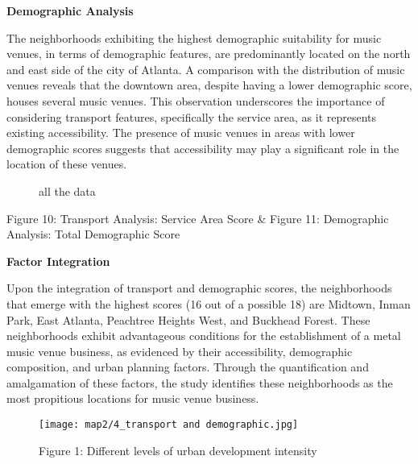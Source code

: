 \documentclass[11pt]{article}
\begin{document}
\textbf{Demographic Analysis}

The neighborhoods exhibiting the highest demographic suitability for music venues, in terms of demographic features, are predominantly located on the north and east side of the city of Atlanta. A comparison with the distribution of music venues reveals that the downtown area, despite having a lower demographic score, houses several music venues. This observation underscores the importance of considering transport features, specifically the service area, as it represents existing accessibility. The presence of music venues in areas with lower demographic scores suggests that accessibility may play a significant role in the location of these venues.

\begin{figure}[H] 
    \centering
    \hfill%
    \caption{all the data}
\end{figure}

\begin{center}
\centering
Figure 10: Transport Analysis: Service Area Score \& Figure 11: Demographic Analysis: Total Demographic Score
\end{center}

\newpage

\textbf{Factor Integration}

Upon the integration of transport and demographic scores, the neighborhoods that emerge with the highest scores (16 out of a possible 18) are Midtown, Inman Park, East Atlanta, Peachtree Heights West, and Buckhead Forest. These neighborhoods exhibit advantageous conditions for the establishment of a metal music venue business, as evidenced by their accessibility, demographic composition, and urban planning factors. Through the quantification and amalgamation of these factors, the study identifies these neighborhoods as the most propitious locations for music venue business.

\begin{figure}[H]
\begin{center}
\centering
\texttt{[image: map2/4\_transport and demographic.jpg]}
\caption{Figure 1: Different levels of urban development intensity}
\label{fig:figure1}
\end{center}
\end{figure}
\end{document}
